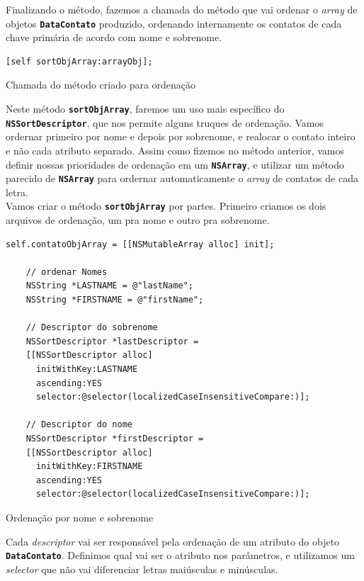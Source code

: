 \documentclass[a4paper,12pt,brazil,oneside]{book}
\begin{document}
Finalizando o método, fazemos a chamada do método que vai ordenar o \emph{array} de objetos \texttt{\textbf{DataContato}} produzido, ordenando internamente os contatos de cada chave primária de acordo com nome e sobrenome.

\begin{listing}[H]
\begin{verbatim}
[self sortObjArray:arrayObj];
\end{verbatim}
\caption{Chamada do método criado para ordenação}
\end{listing}


Neste método \texttt{\textbf{sortObjArray}}, faremos um uso mais específico do \texttt{\textbf{NSSortDescriptor}}, que nos permite alguns truques de ordenação. Vamos ordernar primeiro por nome e depois por sobrenome, e realocar o contato inteiro e não cada atributo separado. Assim como fizemos no método anterior, vamos definir nossas prioridades de ordenação em um \texttt{\textbf{NSArray}}, e utilizar um método parecido de \texttt{\textbf{NSArray}} para ordernar automaticamente o \emph{array} de contatos de cada letra.\\

Vamos criar o método \texttt{\textbf{sortObjArray}} por partes. Primeiro criamos os dois arquivos de ordenação, um pra nome e outro pra sobrenome.

\begin{listing}[H]
\begin{verbatim}
self.contatoObjArray = [[NSMutableArray alloc] init];
    
    // ordenar Nomes
    NSString *LASTNAME = @"lastName";
    NSString *FIRSTNAME = @"firstName";
    
    // Descriptor do sobrenome
    NSSortDescriptor *lastDescriptor =
    [[NSSortDescriptor alloc]
      initWithKey:LASTNAME
      ascending:YES
      selector:@selector(localizedCaseInsensitiveCompare:)];
    
    // Descriptor do nome
    NSSortDescriptor *firstDescriptor =
    [[NSSortDescriptor alloc]
      initWithKey:FIRSTNAME
      ascending:YES
      selector:@selector(localizedCaseInsensitiveCompare:)];
\end{verbatim}
\caption{Ordenação por nome e sobrenome}
\end{listing}


Cada \emph{descriptor} vai ser responsável pela ordenação de um atributo do objeto \texttt{\textbf{DataContato}}. Definimos qual vai ser o atributo nos parâmetros, e utilizamos um \emph{selector} que não vai diferenciar letras maiúsculas e minúsculas.
\end{document}
